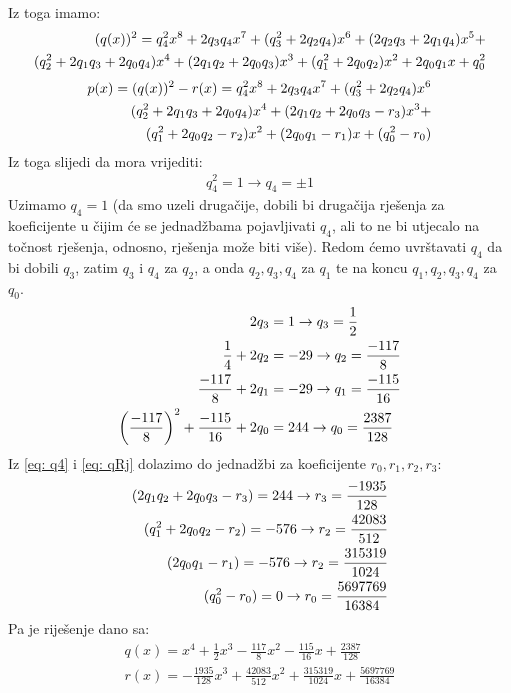 \documentclass[12pt, a4paper]{article}
\begin{document}
\begin{spacing}{1.5}
Iz toga imamo:
\begin{align}
\label{eq: q2}
(q(x))^2=q_4^2 x^8 + 2q_3 q_4 x^7 +(q_3^2 + 2q_2 q_4)x^6+(2q_2q_3 + 2q_1q_4)x^5+ \notag
\\
(q_2^2+2q_1q_3+2q_0q_4)x^4+(2q_1q_2+2q_0q_3)x^3+(q_1^2+2q_0q_2)x^2+2q_0q_1 x + q_0^2 
\end{align}
\begin{align}
	p(x)=(q(x))^2-r(x)=q_4^2 x^8 + 2q_3 q_4 x^7 +(q_3^2 + 2q_2 q_4)x^6 \notag \\
	    (q_2^2+2q_1q_3+2q_0q_4)x^4+(2q_1q_2+2q_0q_3 - r_3)x^3+ \\ (q_1^2+2q_0q_2 - r_2)x^2+(2q_0q_1 -r_1)x + (q_0^2-r_0)  \notag
\end{align}
Iz toga slijedi da mora vrijediti:
\begin{align}
\label{eq: q4}
q_4^2=1 \to q_4=\pm 1	
\end{align}
Uzimamo $q_4=1$ (da smo uzeli drugačije, dobili bi drugačija rješenja za koeficijente u čijim će se jednadžbama pojavljivati $q_4$, ali to ne bi utjecalo na točnost rješenja, odnosno, rješenja može biti više). Redom ćemo uvrštavati $q_4$ da bi dobili $q_3$, zatim  $q_3$ i $q_4$ za $q_2$,  a onda $q_2, q_3, q_4$ za $q_1$ te na koncu $q_1,q_2, q_3, q_4$ za $q_0$.
\begin{align}
\label{eq: qRj}
2q_3&=1 \to q_3=\frac{1}{2} \notag \\
\frac{1}{4} + 2q_2&=-29 \to 	q_2=\frac{-117}{8} \notag \\
\frac{-117}{8} +2q_1&=-29 \to q_1=\frac{-115}{16} \\
\left(\frac{-117}{8}\right)^2 + \frac{-115}{16}+2q_0 &= 244 \to q_0=\frac{2387}{128} \notag
\end{align}
Iz \eqref{eq: q4} i \eqref{eq: qRj} dolazimo do jednadžbi za koeficijente $r_0, r_1, r_2, r_3$:
\begin{align}
(2q_1q_2+2q_0q_3 - r_3)=244 \to r_3=\frac{-1935}{128} \notag \\
 (q_1^2+2q_0q_2 - r_2)=-576 \to r_2 =\frac{42083}{512} \notag \\
 (2q_0q_1 -r_1)=-576 \to r_2 =\frac{315319}{1024} \\
 (q_0^2-r_0)=0 \to r_0=\frac{5697769}{16384}  \notag
\end{align}
Pa je riješenje dano sa:
\begin{align*}
q(x)=x^4 + \frac{1}{2} x^3-\frac{117}{8}x^2-\frac{115}{16}x + \frac{2387}{128} \\[0.5cm]
r(x)=-\frac{1935}{128} x^3 + \frac{42083}{512} x^2 + \frac{315319}{1024}x + \frac{5697769}{16384}
\end{align*}
\end{spacing}
\newpage
\nocite{*}


\end{document}
